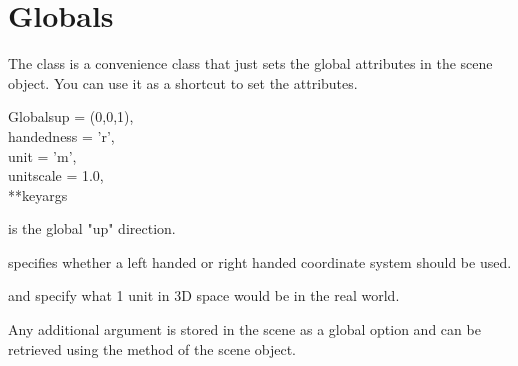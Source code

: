 
\section{Globals}

The  class is a convenience class that just sets the
global attributes in the scene object. You can use it as a shortcut
to set the attributes.

\begin{classdesc}{Globals}{up = (0,0,1), \\
                           handedness = 'r', \\
                           unit = 'm', \\
                           unitscale = 1.0, \\
                           **keyargs}

 is the global "up" direction.

 specifies whether a left handed or right handed coordinate
system should be used.

 and  specify what 1 unit in 3D space would 
be in the real world.

Any additional argument is stored in the scene as a global option
and can be retrieved using the  method of
the scene object.

\end{classdesc}
